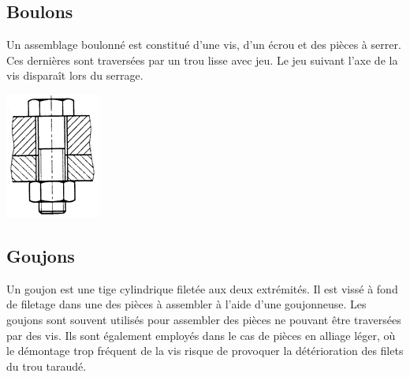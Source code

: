 \documentclass[11pt,oneside]{article}
\begin{document}
\subsection{Boulons}
\begin{defi}
\begin{minipage}[c]{.7\linewidth}
Un assemblage boulonné est constitué d'une vis, d'un écrou et des pièces à serrer. Ces dernières sont traversées par un trou lisse avec jeu. Le jeu suivant l'axe de la vis disparaît lors du serrage. 
\end{minipage} \hfill
\begin{minipage}[c]{.25\linewidth}
\begin{center}
\includegraphics[width=.8\textwidth]{png/boulon}
\end{center}
\end{minipage}
\end{defi}
\subsection{Goujons}

Un goujon est une tige cylindrique filetée aux deux extrémités. Il est vissé à fond de filetage dans une des pièces à assembler à l’aide d’une goujonneuse.
Les goujons sont souvent utilisés pour assembler des pièces ne pouvant être traversées par des vis.
Ils sont également employés dans le cas de pièces en alliage léger, où le démontage trop fréquent de la vis risque de provoquer la détérioration des filets du trou taraudé.
\end{document}
